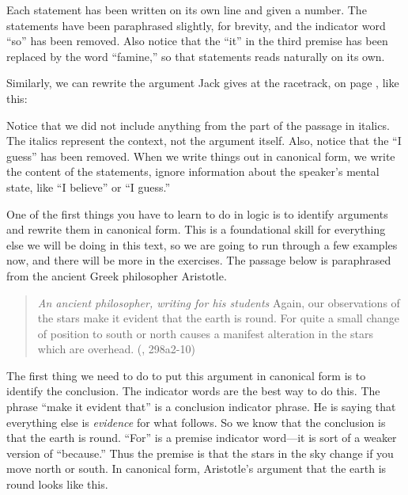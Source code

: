 \begin{kormanize}
\end{kormanize}

Each statement has been written on its own line and given a number. The statements have been paraphrased slightly, for brevity, and the indicator word ``so'' has been removed. Also notice that the ``it'' in the third premise has been replaced by the word ``famine,'' so that statements reads naturally on its own.

Similarly, we can rewrite the argument Jack gives at the racetrack, on page \pageref{racetrack}, like this:

\begin{kormanize}
\end{kormanize}

Notice that we did not include anything from the part of the passage in italics. The italics represent the context, not the argument itself. Also, notice that the ``I guess'' has been removed. When we write things out in canonical form, we write the content of the statements, ignore information about the speaker's mental state, like ``I believe'' or ``I guess.''

One of the first things you have to learn to do in logic is to identify arguments and rewrite them in canonical form. This is a foundational skill for everything else we will be doing in this text, so we are going to run through a few examples now, and there will be more in the exercises. The passage below is paraphrased from the ancient Greek philosopher Aristotle.

\begin{quotation}\noindent \textit{An ancient philosopher, writing for his students} Again, our observations of the stars make it evident that the earth is round. For quite a small change of position to south or north causes a manifest alteration in the stars which are overhead. (\cite{Aristotle:heavens}, 298a2-10)
\label{on_the_heavens} \end{quotation}

The first thing we need to do to put this argument in canonical form is to identify the conclusion. The indicator words are the best way to do this. The phrase ``make it evident that'' is a conclusion indicator phrase. He is saying that everything else is \textit{evidence} for what follows. So we know that the conclusion is that the earth is round. ``For'' is a premise indicator word---it is sort of a weaker version of ``because.''  Thus the premise is that the stars in the sky change if you move north or south. In canonical form, Aristotle's argument that the earth is round looks like this.\\


